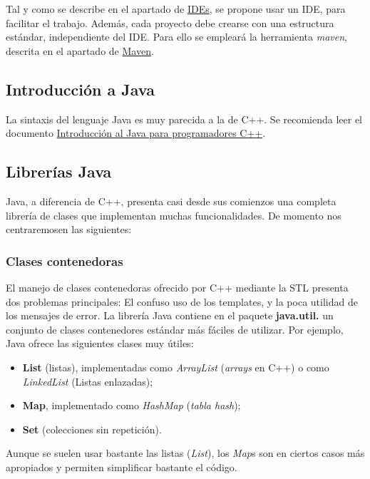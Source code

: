 \documentclass[11pt]{article}
\begin{document}
Tal y como se describe en el apartado de \hyperref[sec-3]{IDEs}, se propone usar un IDE, para facilitar el trabajo. Además, cada proyecto debe crearse con una estructura estándar, independiente del IDE. Para ello se empleará la herramienta \emph{maven}, descrita en el apartado de \hyperref[sec-5]{Maven}.


\subsection{Introducción a Java}
\label{sec-2-1}
\label{fd70e36c-20a8-4577-90be-f671166ae3f1}


La sintaxis del lenguaje Java es muy parecida a la de C++. Se recomienda leer el documento \href{http://www.xtec.es/~acastan/textos/Java.pdf}{Introducción al Java para programadores C++}.


\subsection{Librerías Java}
\label{sec-2-2}

Java, a diferencia de C++, presenta casi desde sus comienzos una completa librería de clases que implementan muchas funcionalidades. De momento nos centraremosen las siguientes:

\subsubsection{Clases contenedoras}
\label{sec-2-2-1}

El manejo de clases contenedoras ofrecido por C++ mediante la STL presenta dos problemas principales: El confuso uso de los templates, y la poca utilidad de los mensajes de error. La librería Java contiene en el paquete \textbf{java.util.\*} un conjunto de clases contenedores estándar más fáciles de utilizar. Por ejemplo, Java ofrece las siguientes clases muy útiles:

\begin{itemize}
  \item \textbf{List} (listas), implementadas como  \emph{ArrayList} (\emph{arrays} en C++) o como \emph{LinkedList} (Listas enlazadas);
  \item \textbf{Map}, implementado como \emph{HashMap} (\emph{tabla hash});
  \item \textbf{Set} (colecciones sin repetición).
\end{itemize}

Aunque se suelen usar bastante las listas (\emph{List}), los \emph{Map}s son en ciertos casos más apropiados y permiten simplificar bastante el código. 
\end{document}

